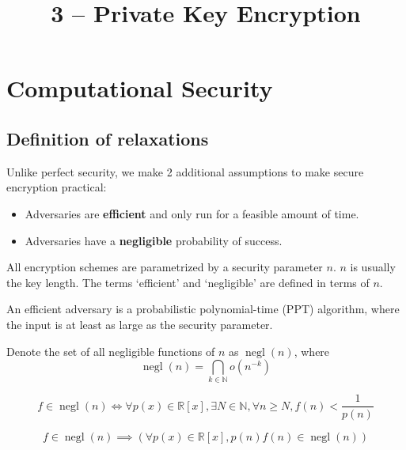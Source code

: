 

\title{3 -- Private Key Encryption}

\newcommand*{\PrivKExpt}[2]{\operatorname{PrivK}_{#2}^{\textrm{#1}}}
\newcommand*{\PrivKOut}[2]{\operatorname{PrivKOut}_{#2}^{\textrm{#1}}}



\maketitle
\initMinimal{}

\tableofcontents

\section{Computational Security}

\subsection{Definition of relaxations}

Unlike perfect security, we make 2 additional assumptions to make
secure encryption practical:
\begin{itemize}
\item Adversaries are \textbf{efficient} and only run for a feasible amount of time.
\item Adversaries have a \textbf{negligible} probability of success.
\end{itemize}

All encryption schemes are parametrized by a security parameter $n$.
$n$ is usually the key length.
The terms `efficient' and `negligible' are defined in terms of $n$.

\begin{definition}
An efficient adversary is a probabilistic polynomial-time (PPT) algorithm,
where the input is at least as large as the security parameter.
\end{definition}
\begin{definition}
Denote the set of all negligible functions of $n$ as $\operatorname{negl}(n)$, where
\[ \operatorname{negl}(n) = \bigcap_{k \in \mathbb{N}} o(n^{-k}) \]
\end{definition}

\begin{theorem}
\[ f \in \operatorname{negl}(n) \iff \forall p(x) \in \mathbb{R}[x],
\exists N \in \mathbb{N}, \forall n \ge N, f(n) < \frac{1}{p(n)} \]
\end{theorem}
\begin{theorem}
\[ f \in \operatorname{negl}(n) \implies (\forall p(x) \in \mathbb{R}[x], p(n)f(n) \in \operatorname{negl}(n)) \]
\end{theorem}

